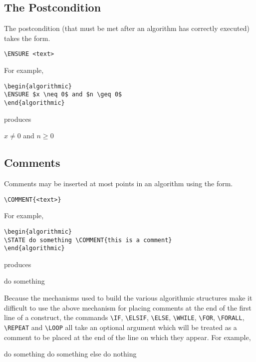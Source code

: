 \documentclass{article}
\begin{document}
\subsection{The Postcondition}

The postcondition (that must be met after an algorithm has correctly
executed) takes the form.
\begin{verbatim}
\ENSURE <text>
\end{verbatim}
For example,
\begin{verbatim}
\begin{algorithmic}
\ENSURE $x \neq 0$ and $n \geq 0$
\end{algorithmic}
\end{verbatim}
produces
\begin{algorithmic}
\ENSURE $x \neq 0$ and $n \geq 0$
\end{algorithmic}

\subsection{Comments}

Comments may be inserted at most points in an algorithm using the
form.
\begin{verbatim}
\COMMENT{<text>}
\end{verbatim}
For example,
\begin{verbatim}
\begin{algorithmic}
\STATE do something \COMMENT{this is a comment}
\end{algorithmic}
\end{verbatim}
produces
\begin{algorithmic}
\STATE do something 
\end{algorithmic}
Because the mechanisms used to build the various algorithmic structures
make it difficult to use the above mechanism for placing comments at the
end of the first line of a construct, the commands \verb+\IF+,
\verb+\ELSIF+, \verb+\ELSE+, \verb+\WHILE+, \verb+\FOR+,
\verb+\FORALL+, \verb+\REPEAT+
and \verb+\LOOP+ all take an optional argument which will be treated
as a comment to be placed at the end of the line on which they appear.
For example,
\begin{algorithmic}
\STATE do something
\STATE do something else
\STATE do nothing
\ENDIF
{}
\end{algorithmic}
\end{document}
